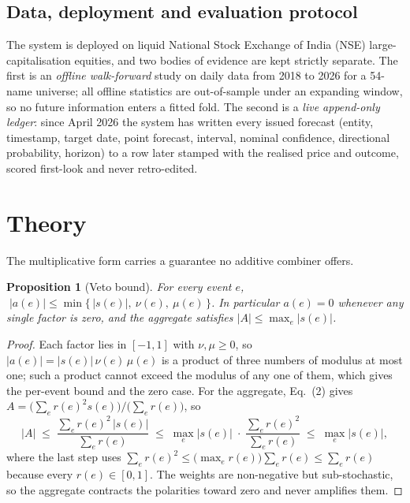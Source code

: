 \documentclass[12pt,a4paper]{article}
\newtheorem{proposition}{Proposition}
\begin{document}
\subsection{Data, deployment and evaluation protocol}

The system is deployed on liquid National Stock Exchange of India (NSE)
large-capitalisation equities, and two bodies of evidence are kept strictly
separate. The first is an \emph{offline walk-forward} study on daily data from 2018
to 2026 for a 54-name universe; all offline statistics are out-of-sample under an
expanding window, so no future information enters a fitted fold. The second is a
\emph{live append-only ledger}: since April 2026 the system has written every issued
forecast (entity, timestamp, target date, point forecast, interval, nominal
confidence, directional probability, horizon) to a row later stamped with the
realised price and outcome, scored first-look and never retro-edited.

\section{Theory}

The multiplicative form carries a guarantee no additive combiner offers.
\vspace{-0.3\baselineskip}

\begin{singlespace}
\begin{proposition}[Veto bound]
For every event $e$, $\;|a(e)| \le \min\{\,|s(e)|,\ \nu(e),\ \mu(e)\,\}$. In
particular $a(e)=0$ whenever any single factor is zero, and the aggregate satisfies
$|A|\le \max_{e}|s(e)|$.
\end{proposition}

\begin{proof}
Each factor lies in $[-1,1]$ with $\nu,\mu\ge 0$, so
$|a(e)|=|s(e)|\,\nu(e)\,\mu(e)$ is a product of three numbers of modulus at most
one; such a product cannot exceed the modulus of any one of them, which gives the
per-event bound and the zero case. For the aggregate, Eq.~(2) gives
$A=\big(\sum_e r(e)^2 s(e)\big)/\big(\sum_e r(e)\big)$, so
\[
|A|\;\le\;\frac{\sum_e r(e)^2\,|s(e)|}{\sum_e r(e)}\;\le\;\max_e|s(e)|\;\cdot\;
\frac{\sum_e r(e)^2}{\sum_e r(e)}\;\le\;\max_e|s(e)|,
\]
where the last step uses $\sum_e r(e)^2\le\big(\max_e r(e)\big)\sum_e r(e)\le\sum_e
r(e)$ because every $r(e)\in[0,1]$. The weights are non-negative but sub-stochastic,
so the aggregate contracts the polarities toward zero and never amplifies them.
\end{proof}
\end{singlespace}
\end{document}
